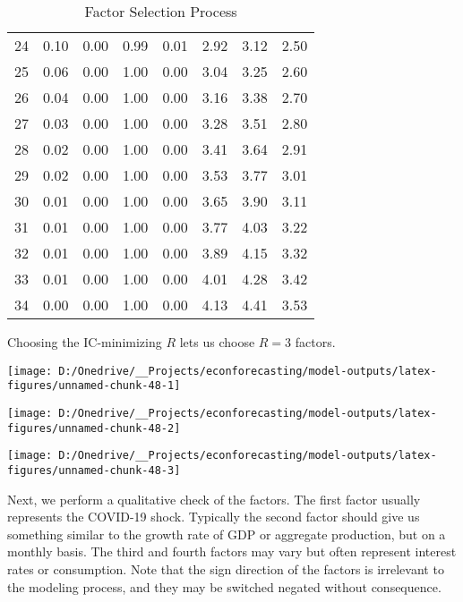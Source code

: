 \documentclass[11pt, letterpaper]{article}\usepackage[]{graphicx}\usepackage[]{color}
\begin{document}
\begin{table}[H]
\begin{tabular}{cccccccc}
   24 & 0.10 & 0.00 & 0.99 & 0.01 & 2.92 & 3.12 & 2.50 \\ 
   25 & 0.06 & 0.00 & 1.00 & 0.00 & 3.04 & 3.25 & 2.60 \\ 
   26 & 0.04 & 0.00 & 1.00 & 0.00 & 3.16 & 3.38 & 2.70 \\ 
   27 & 0.03 & 0.00 & 1.00 & 0.00 & 3.28 & 3.51 & 2.80 \\ 
   28 & 0.02 & 0.00 & 1.00 & 0.00 & 3.41 & 3.64 & 2.91 \\ 
   29 & 0.02 & 0.00 & 1.00 & 0.00 & 3.53 & 3.77 & 3.01 \\ 
   30 & 0.01 & 0.00 & 1.00 & 0.00 & 3.65 & 3.90 & 3.11 \\ 
   31 & 0.01 & 0.00 & 1.00 & 0.00 & 3.77 & 4.03 & 3.22 \\ 
   32 & 0.01 & 0.00 & 1.00 & 0.00 & 3.89 & 4.15 & 3.32 \\ 
   33 & 0.01 & 0.00 & 1.00 & 0.00 & 4.01 & 4.28 & 3.42 \\ 
   34 & 0.00 & 0.00 & 1.00 & 0.00 & 4.13 & 4.41 & 3.53 \\ 
   \hline
\end{tabular}
\endgroup
\caption{Factor Selection Process} 
\end{table}


Choosing the IC-minimizing $R$ lets us choose $R = 3$ factors.



{\centering \texttt{[image: D:/Onedrive/\_\_Projects/econforecasting/model-outputs/latex-figures/unnamed-chunk-48-1]} 

}




{\centering \texttt{[image: D:/Onedrive/\_\_Projects/econforecasting/model-outputs/latex-figures/unnamed-chunk-48-2]} 

}




{\centering \texttt{[image: D:/Onedrive/\_\_Projects/econforecasting/model-outputs/latex-figures/unnamed-chunk-48-3]} 

}




Next, we perform a qualitative check of the factors. The first factor usually represents the COVID-19 shock. Typically the second factor should give us something similar to the growth rate of GDP or aggregate production, but on a monthly basis. The third and fourth factors may vary but often represent interest rates or consumption. Note that the sign direction of the factors is irrelevant to the modeling process, and they may be switched negated without consequence. 
\end{document}
